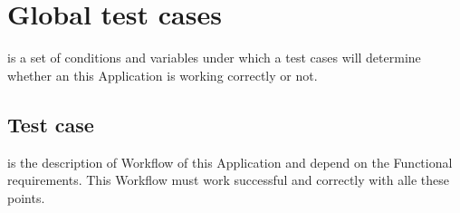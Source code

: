 \section{Global test cases}

is a set of conditions and variables under which a test cases will determine whether an this Application is working correctly 
or not.

\renewcommand{\theenumi}{/T\arabic{enumi}0/}
\renewcommand{\labelenumi}{\theenumi}

\subsection{Test case}

is the description of Workflow of this Application and depend on the Functional requirements. This Workflow must work
successful and correctly with alle these points. 

